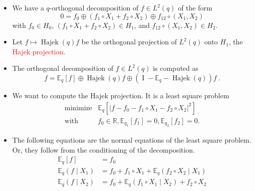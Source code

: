 \documentclass[xcolor=svgnames]{beamer}
\DeclareMathOperator{\Hajek}{Hajek}
\newcommand{\avalof}[1]{\left\vert#1\right\vert}
\newcommand{\condexpat}[3]{\mathbb E_{#1}\left(#2 \middle| #3\right)}
\newcommand{\expectat}[2]{\mathbb E_{#1}\left[#2\right]}
\newcommand{\hajekof}[1]{\Hajek\left(#1\right)}
\newcommand{\reals}{\mathbb{R}}
\newcommand{\rosso}[1]{\textcolor{red}{#1}}
\renewcommand{\emph}{\rosso}
\begin{document}
\begin{frame}
\begin{itemize}
    \item We have a $q$-orthogonal decomposition of $f \in L^2(q)$ of the form
    \begin{equation*}
    0 = f_0 \oplus (f_1\circ X_1 + f_2\circ X_2) \oplus f_{12}\circ (X_1,X_2)
    \end{equation*}
    with $f_0 \in H_0$, $(f_1\circ X_1 + f_2\circ X_2) \in H_1$, and $f_{12}\circ (X_1,X_2) \in H_2$. 
    \item Let $f \mapsto \hajekof q f$ be the orthogonal projection of $L^2(q)$ onto $H_1$, the \emph{Hajek projection}.
    \item The orthogonal decomposition of $f \in L^2(q)$ is computed as
    \begin{equation*}
        f = \expectat q f \oplus \hajekof q f \oplus (\operatorname I  - 
 \mathbb E_q - \hajekof q) f \ .
    \end{equation*}
    \item We want to compute the Hajek projection. It is a least square problem
      \begin{equation*}
        \begin{array}{ll}
    \text{minimize} & \expectat q {\avalof {f - f_0 - f_1\circ X_1 - f_2\circ X_2}^2} \\    
    \text{with}& f_0 \in \reals, \expectat {q_1} {f_1} = 0, \expectat {q_2} {f_2} = 0.
    \end{array}
      \end{equation*}
    \item The following equations are the normal equations of the least square problem. Or, they follow from the conditioning of the decomposition.
    \begin{align*}
        \expectat q {f} &= f_0 \\
        \condexpat q {f}{X_1} &= f_0 + f_1\circ X_1 + \condexpat q {f_2 \circ X_2}{X_1} \\ 
            \condexpat q {f}{X_2} &= f_0 + \condexpat q {f_1 \circ X_1}{X_2} + f_2\circ X_2
        \end{align*}
\end{itemize}
\end{frame}
\end{document}
